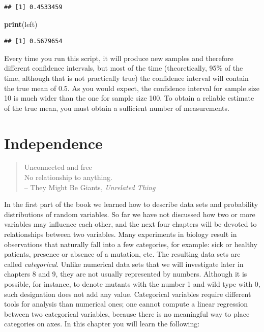 \documentclass[
]{book}
\newenvironment{Shaded}{\begin{snugshade}}{\end{snugshade}}
\newcommand{\KeywordTok}[1]{\textcolor[rgb]{0.13,0.29,0.53}{\textbf{#1}}}
\newcommand{\NormalTok}[1]{#1}
\theoremstyle{definition}
\theoremstyle{definition}
\theoremstyle{definition}
\theoremstyle{remark}
\begin{document}
\begin{verbatim}
## [1] 0.4533459
\end{verbatim}

\begin{Shaded}
\begin{Highlighting}[]
\KeywordTok{print}\NormalTok{(left)}
\end{Highlighting}
\end{Shaded}

\begin{verbatim}
## [1] 0.5679654
\end{verbatim}

Every time you run this script, it will produce new samples and therefore different confidence intervals, but most of the time (theoretically, 95\% of the time, although that is not practically true) the confidence interval will contain the true mean of 0.5. As you would expect, the confidence interval for sample size 10 is much wider than the one for sample size 100. To obtain a reliable estimate of the true mean, you must obtain a sufficient number of measurements.

\hypertarget{independence}{%
\chapter{Independence}\label{independence}}

\begin{quote}
Unconnected and free\\
No relationship to anything.\\
-- They Might Be Giants, \emph{Unrelated Thing}
\end{quote}

In the first part of the book we learned how to describe data sets and probability distributions of random variables. So far we have not discussed how two or more variables may influence each other, and the next four chapters will be devoted to relationships between two variables. Many experiments in biology result in observations that naturally fall into a few categories, for example: sick or healthy patients, presence or absence of a mutation, etc. The resulting data sets are called \emph{categorical}. Unlike numerical data sets that we will investigate later in chapters 8 and 9, they are not usually represented by numbers. Although it is possible, for instance, to denote mutants with the number 1 and wild type with 0, such designation does not add any value. Categorical variables require different tools for analysis than numerical ones; one cannot compute a linear regression between two categorical variables, because there is no meaningful way to place categories on axes. In this chapter you will learn the following:
\end{document}
